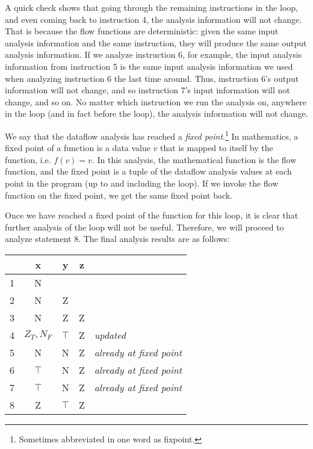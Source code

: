 \documentclass[11pt]{article}
\def\tablespace{\vspace{2ex}}
\begin{document}
A quick check shows that going through the remaining instructions in the loop,
and even coming back to instruction 4, the analysis information will not change.
That is because the flow functions are deterministic: given the same input
analysis information and the same instruction, they will produce the same output
analysis information.  If we analyze instruction 6, for example, the input
analysis information from instruction 5 is the same input analysis information
we used when analyzing instruction 6 the last time around.  Thus, instruction
6's output information will not change, and so instruction 7's input information
will not change, and so on.  No matter which instruction we run the analysis on,
anywhere in the loop (and in fact before the loop), the analysis information
will not change.

We say that the dataflow analysis has reached a \textit{fixed
  point}.\footnote{Sometimes abbreviated in one word as fixpoint.} In
mathematics, a fixed point of a function is a data value $v$ that is mapped to
itself by the function, i.e. $f(v) = v$.  In this analysis, the mathematical
function is the flow function, and the fixed point is a tuple of the dataflow
analysis values at each point in the program (up to and including the loop).  If
we invoke the flow function on the fixed point, we get the same fixed point
back.

Once we have reached a fixed point of the function for this loop, it is clear
that further analysis of the loop will not be useful.  Therefore, we will
proceed to analyze statement 8.  The final analysis results are as follows:

\tablespace
\begin{tabular}{r | c c c l}

  & x & y & z \\
\hline
1 & N &   &   \\
2 & N & Z &   \\
3 & N & Z & Z \\
4 & $Z_T,N_F$ & $\top$ & Z & \textit{updated} \\
5 & N & N & Z & \textit{already at fixed point} \\
6 & $\top$ & N & Z & \textit{already at fixed point} \\
7 & $\top$ & N & Z & \textit{already at fixed point} \\
8 & Z & $\top$ & Z \\

\end{tabular}
\tablespace
\end{document}
